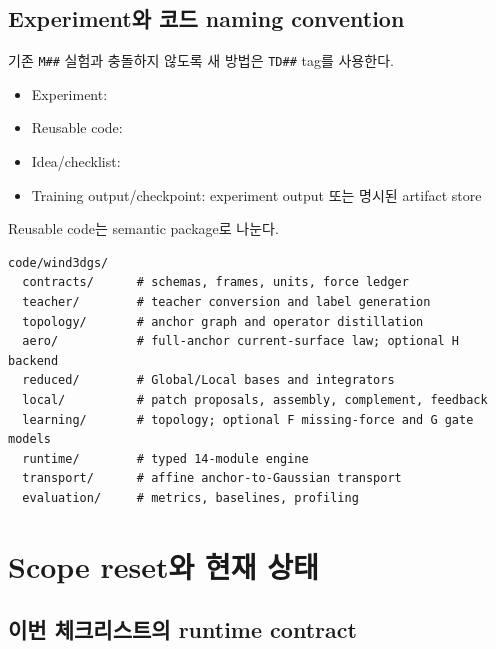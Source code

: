 \documentclass[10pt,a4paper]{article}
\newcommand{\code}[1]{\texttt{#1}}
\begin{document}
\subsection{Experiment와 코드 naming convention}

기존 \code{M\#\#} 실험과 충돌하지 않도록 새 방법은 \code{TD\#\#} tag를 사용한다.

\begin{tcolorbox}[colback=LightGray,colframe=black!20,title=권장 경로,fonttitle=\bfseries]
\begin{itemize}
  \item Experiment: 
  \item Reusable code: 
  \item Idea/checklist: 
  \item Training output/checkpoint: experiment output 또는 명시된 artifact store
\end{itemize}
\end{tcolorbox}

Reusable code는 semantic package로 나눈다.

\begin{lstlisting}
code/wind3dgs/
  contracts/      # schemas, frames, units, force ledger
  teacher/        # teacher conversion and label generation
  topology/       # anchor graph and operator distillation
  aero/           # full-anchor current-surface law; optional H backend
  reduced/        # Global/Local bases and integrators
  local/          # patch proposals, assembly, complement, feedback
  learning/       # topology; optional F missing-force and G gate models
  runtime/        # typed 14-module engine
  transport/      # affine anchor-to-Gaussian transport
  evaluation/     # metrics, baselines, profiling
\end{lstlisting}

\section{Scope reset와 현재 상태}

\subsection{이번 체크리스트의 runtime contract}
\end{document}
